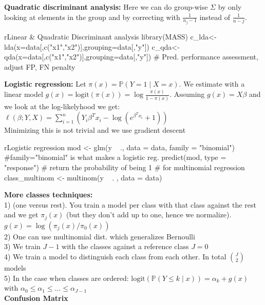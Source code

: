 \textbf{Quadratic discriminant analysis:} Here we can do group-wise $\Sigma$ by only looking at elements in the group and by correcting with $\frac{1}{n_j-1}$ instead of $\frac{1}{n-j}$.
\begin{codebox}{r}{Linear \& Quadratic Discriminant analysis}
library(MASS)
c_lda<-lda(x=data[,c("x1","x2")],grouping=data[,"y"])
c_qda<-qda(x=data[,c("x1","x2")],grouping=data[,"y"])
# Pred. performance assessment, adjust FP, FN penalty
\end{codebox}
\textbf{Logistic regression:} Let $\pi(x) = \mathbb{P}(Y=1\mid X = x)$. We estimate with a linear model $g(x) = \text{logit}(\pi(x)) = \log\frac{\pi(x)}{1-\pi(x)}$. Assuming $g(x) = X\beta$ and we look at the log-likelyhood we get:
$\ell(\beta;Y,X)=\sum_{i=1}^n\left(Y_i \beta^Tx_i - \log\left(e^{\beta^Tx_i} +1\right)\right)$\\
Minimizing this is not trivial and we use gradient descent\\
\begin{codebox}{r}{Logistic regression}
mod <- glm(y ~ ., data = data, family = "binomial")
#family="binomial" is what makes a logistic reg.
predict(mod, type = "response") # return the probability of being 1
# for multinomial regression
class_multinom <- multinom(y ~ . , data = data)
\end{codebox}
\textbf{More classes techniques:}\\
1) (one versus rest). You train a model per class with that class against the rest and we get $\pi_j(x)$ (but they don't add up to one, hence we normalize). $g(x) = \log(\pi_j(x)/\pi_0(x))$\\
2) One can use multinomial dist. which generalizes Bernoulli\\
3) We train $J-1$ with the classes against a reference class $J=0$\\
4) We train a model to distinguish each class from each other. In total $\binom{J}{2}$ models\\
5) In the case when classes are ordered: $\text{logit}(\mathbb{P}(Y\leq k \mid x))=\alpha_k +g(x)$ with $\alpha_0\leq\alpha_1\leq\dots\leq \alpha_{J-1}$\\
\textbf{Confusion Matrix}\\ %

